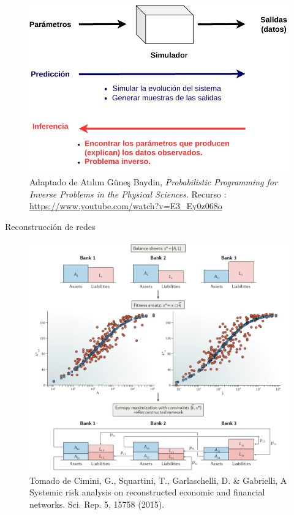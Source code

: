 \documentclass[11pt]{beamer}
\begin{document}
\begin{frame}
	\begin{figure}
		\includegraphics[scale=0.8]{images/turing_ode-simulators-3.pdf}
		\caption{\scriptsize Adaptado de Atılım Güneş Baydin, \textit{Probabilistic Programming for Inverse Problems in the Physical Sciences}. Recurso : \url{https://www.youtube.com/watch?v=E3_Ey0z068o}}
	\end{figure}
\end{frame}

\begin{frame}{Reconstrucción de redes}
	\begin{figure}
		\includegraphics[scale=0.9]{images/financial_net}
		\caption{\tiny Tomado de Cimini, G., Squartini, T., Garlaschelli, D. \& Gabrielli, A Systemic risk analysis on reconstructed economic and
financial networks. Sci. Rep. 5, 15758 (2015).}
	\end{figure}
\end{frame}
\end{document}
